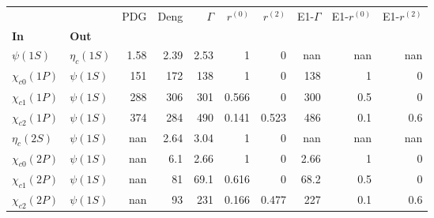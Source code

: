 \begin{tabular}{l|l|r|r|r|r|r|r|r|r}
\toprule
                &            &  PDG &  Deng &  $\Gamma$ &  $r^{(0)}$ &  $r^{(2)}$ &  E1-$\Gamma$ &  E1-$r^{(0)}$ &  E1-$r^{(2)}$ \\
\textbf{In} & \textbf{Out} &      &       &           &            &            &              &               &               \\
\midrule
\textbf{$\psi(1S)$} & \textbf{$\eta_{c}(1S)$} & 1.58 &  2.39 &      2.53 &          1 &          0 &          nan &           nan &           nan \\
\textbf{$\chi_{c0}(1P)$} & \textbf{$\psi(1S)$} &  151 &   172 &       138 &          1 &          0 &          138 &             1 &             0 \\
\textbf{$\chi_{c1}(1P)$} & \textbf{$\psi(1S)$} &  288 &   306 &       301 &      0.566 &          0 &          300 &           0.5 &             0 \\
\textbf{$\chi_{c2}(1P)$} & \textbf{$\psi(1S)$} &  374 &   284 &       490 &      0.141 &      0.523 &          486 &           0.1 &           0.6 \\
\textbf{$\eta_{c}(2S)$} & \textbf{$\psi(1S)$} &  nan &  2.64 &      3.04 &          1 &          0 &          nan &           nan &           nan \\
\textbf{$\chi_{c0}(2P)$} & \textbf{$\psi(1S)$} &  nan &   6.1 &      2.66 &          1 &          0 &         2.66 &             1 &             0 \\
\textbf{$\chi_{c1}(2P)$} & \textbf{$\psi(1S)$} &  nan &    81 &      69.1 &      0.616 &          0 &         68.2 &           0.5 &             0 \\
\textbf{$\chi_{c2}(2P)$} & \textbf{$\psi(1S)$} &  nan &    93 &       231 &      0.166 &      0.477 &          227 &           0.1 &           0.6 \\
\bottomrule
\end{tabular}
